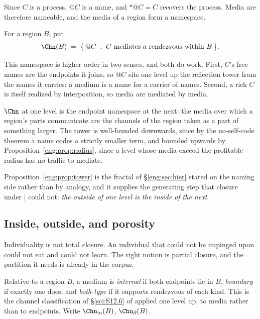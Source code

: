 Since $C$ is a process, $@C$ is a name, and $*@C = C$ recovers the process.
Media are therefore nameable, and the media of a region form a namespace.

\begin{definition}\label{eng:def:med}
For a region $B$, put
\[
  \Chn(B) \;=\; \bigl\{\, @C \;:\; C \text{ mediates a rendezvous
  within } B \,\bigr\}.
\]
\end{definition}

This namespace is higher order in two senses, and both do work. First,
$C$'s free names are the endpoints it joins, so $@C$ sits one level up
the reflection tower from the names it carries: a medium is a name for a
carrier of names. Second, a rich $C$ is itself realized by interposition,
so media are mediated by media.

\begin{proposition}\label{eng:prop:tower}
$\Chn$ at one level is the endpoint namespace at the next: the media over
which a region's parts communicate are the channels of the region taken as
a part of something larger. The tower is well-founded downwards, since by
the no-self-code theorem a name codes a strictly smaller term, and bounded
upwards by Proposition~\ref{eng:prop:radius}, since a level whose media exceed
the profitable radius has no traffic to mediate.
\end{proposition}

Proposition~\ref{eng:prop:tower} is the fractal of \S\ref{eng:sec:hier} stated on
the naming side rather than by analogy, and it supplies the generating step
that closure under $\mid$ could not: \emph{the outside of one level is the
inside of the next}.

\subsection{Inside, outside, and porosity}\label{eng:S5.5}
\label{eng:sec:porous}

Individuality is not total closure. An individual that could not be
impinged upon could not eat and could not learn. The right notion is
partial closure, and the partition it needs is already in the corpus.

\begin{definition}\label{eng:def:three}
Relative to a region $B$, a medium is \emph{internal} if both endpoints lie
in $B$, \emph{boundary} if exactly one does, and \emph{both-type} if it
supports rendezvous of each kind. This is the channel classification of
\S\ref{sci:S12.6} of \chSci applied one level up, to media rather than to
endpoints. Write $\Chn_{\mathrm{in}}(B)$, $\Chn_{\partial}(B)$.
\end{definition}

